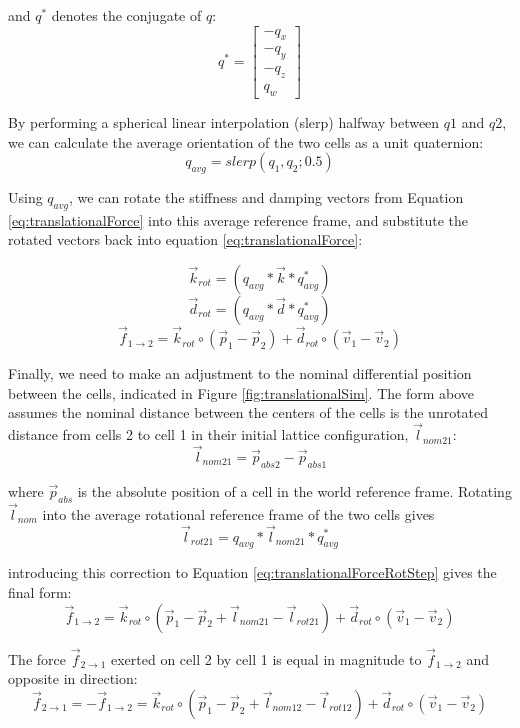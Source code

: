 {   and $q^*$ denotes the conjugate of $q$:
    \[ q^{*} =  \left[ \begin{array}{ccc}
-q_x\\
-q_y\\
-q_z\\
q_w
 \end{array} \right] \] 
 
By performing a spherical linear interpolation (slerp) halfway between $q1$ and $q2$, we can calculate the average orientation of the two cells as a unit quaternion:
  \[ q_{avg} = slerp(q_{1}, q_{2}; 0.5) \]
  
Using $q_{avg}$, we can rotate the stiffness and damping vectors from Equation \ref{eq:translationalForce} into this average reference frame, and substitute the rotated vectors back into equation \ref{eq:translationalForce}:

 \[ \vec{k}_{rot} = (q_{avg}*\vec{k}*q_{avg}^*)\]
  \[ \vec{d}_{rot} = (q_{avg}*\vec{d}*q_{avg}^*)\]
  \begin{equation} \label{eq:translationalForceRotStep}
 \vec{f}_{1\rightarrow2} = \vec{k}_{rot} \circ (\vec{p}_1 - \vec{p}_2) + \vec{d}_{rot} \circ (\vec{v}_1 - \vec{v}_2)
 \end{equation}
 
Finally, we need to make an adjustment to the nominal differential position between the cells, indicated in Figure \ref{fig:translationalSim}.  The form above assumes the nominal distance between the centers of the cells is the unrotated distance from cells 2 to cell 1 in their initial lattice configuration, $\vec{l}_{nom21}$:
 \[\vec{l}_{nom21} = \vec{p}_{abs2}-\vec{p}_{abs1}\]
 
 where $\vec{p}_{abs}$ is the absolute position of a cell in the world reference frame.
 Rotating $\vec{l}_{nom}$ into the average rotational reference frame of the two cells gives
 \[\vec{l}_{rot21} = q_{avg}*\vec{l}_{nom21}*q_{avg}^*\]
 
introducing this correction to Equation \ref{eq:translationalForceRotStep} gives the final form:
 \begin{equation} \label{eq:translationalForceRot}
  \vec{f}_{1\rightarrow2} = \vec{k}_{rot} \circ (\vec{p}_1 - \vec{p}_2 + \vec{l}_{nom21}-\vec{l}_{rot21}) + \vec{d}_{rot} \circ (\vec{v}_1 - \vec{v}_2)
  \end{equation}

The force $\vec{f}_{2\rightarrow1}$ exerted on cell 2 by cell 1 is equal in magnitude to $\vec{f}_{1\rightarrow2}$ and opposite in direction:
\[  \vec{f}_{2\rightarrow1} = -\vec{f}_{1\rightarrow2} = \vec{k}_{rot} \circ (\vec{p}_1 - \vec{p}_2 + \vec{l}_{nom12}-\vec{l}_{rot12}) + \vec{d}_{rot} \circ (\vec{v}_1 - \vec{v}_2) \]

}

